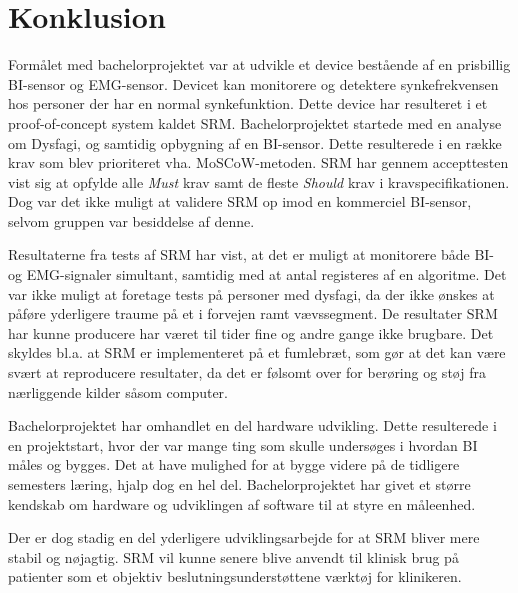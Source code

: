 \chapter{Konklusion}

Formålet med bachelorprojektet var at udvikle et device bestående af en prisbillig BI-sensor og EMG-sensor. Devicet kan monitorere og detektere synkefrekvensen hos personer der har en normal synkefunktion. Dette device har resulteret i et proof-of-concept system kaldet SRM. Bachelorprojektet startede med en analyse om Dysfagi, og samtidig opbygning af en BI-sensor. Dette resulterede i en række krav som blev prioriteret vha. MoSCoW-metoden. SRM har gennem accepttesten vist sig at opfylde alle \textit{Must} krav samt de fleste \textit{Should} krav i kravspecifikationen. Dog var det ikke muligt at validere SRM op imod en kommerciel BI-sensor, selvom gruppen var besiddelse af denne.

Resultaterne fra tests af SRM har vist, at det er muligt at monitorere både BI- og EMG-signaler simultant, samtidig med at antal registeres af en algoritme. Det var ikke muligt at foretage tests på personer med dysfagi, da der ikke ønskes at påføre yderligere traume på et i forvejen ramt vævssegment. De resultater SRM har kunne producere har været til tider fine og andre gange ikke brugbare. Det skyldes bl.a. at SRM er implementeret på et fumlebræt, som gør at det kan være svært at reproducere resultater, da det er følsomt over for berøring og støj fra nærliggende kilder såsom computer.


Bachelorprojektet har omhandlet en del hardware udvikling. Dette resulterede i en projektstart, hvor der var mange ting som skulle undersøges i hvordan BI måles og bygges. Det at have mulighed for at bygge videre på de tidligere semesters læring, hjalp dog en hel del. Bachelorprojektet har givet et større kendskab om hardware og udviklingen af software til at styre en måleenhed. 

Der er dog stadig en del yderligere udviklingsarbejde for at SRM bliver mere stabil og nøjagtig. SRM vil kunne senere blive anvendt til klinisk brug på patienter som et objektiv beslutningsunderstøttene værktøj for klinikeren.













